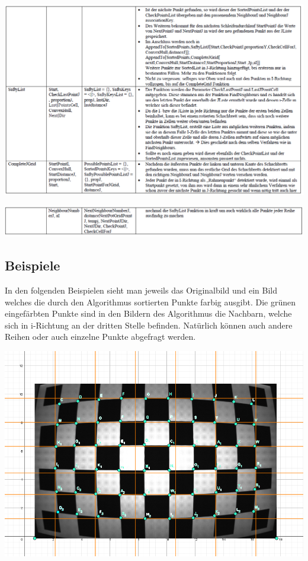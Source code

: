 \begin{minipage}{\linewidth}
	\centering
	\includegraphics[width=1\linewidth]{images/KD4.png}
\end{minipage}
\begin{minipage}{\linewidth}
	\centering
	\includegraphics[width=1\linewidth]{images/KD5.png}
\end{minipage}

\subsection{Beispiele}

In den folgenden Beispielen sieht man jeweils das Originalbild und ein Bild welches die durch den Algorithmus sortierten Punkte farbig ausgibt. Die grünen eingefärbten Punkte sind in den Bildern des Algorithmus die Nachbarn, welche sich in i-Richtung an der dritten Stelle befinden. Natürlich können auch andere Reihen oder auch einzelne Punkte abgefragt werden. 


\begin{minipage}{\linewidth}
	\centering
	\includegraphics[width=1\linewidth]{images/Tonnenverzeichnung.png}
\end{minipage}\\

